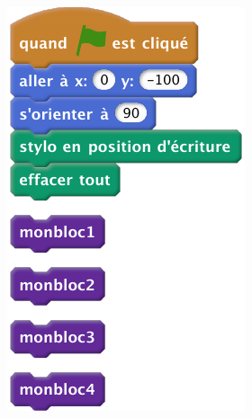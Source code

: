 \documentclass[class=report,crop=false, 12pt]{standalone}
\begin{document}
\begin{enigme}
\begin{minipage}{0.49\textwidth}
\begin{itemize}
\end{itemize} 
\end{minipage}
\begin{minipage}{0.49\textwidth}
\begin{center}
  \includegraphics[scale=\scalebloc]{bloc-11-eg1a}
\end{center} 
\end{minipage}


\end{enigme}
\end{document}
